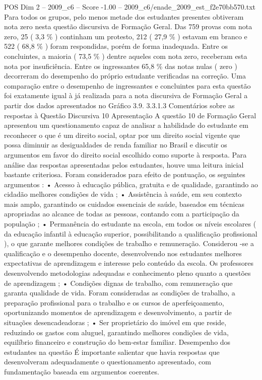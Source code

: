 \begin{textsample}{POS Dim 2 – 2009\_c6 – Score -1.00 – 2009\_c6/enade\_2009\_est\_f2e70bb570.txt}
Para todos os grupos, pelo menos metade dos estudantes presentes obtiveram nota zero nesta questão discursiva de Formação Geral.
Das 759 provas com nota zero, 25 ( 3,3 \% ) continham um protesto, 212 ( 27,9 \% ) estavam em branco e 522 ( 68,8 \% ) foram respondidas, porém de forma inadequada.
Entre os concluintes, a maioria ( 73,5 \% ) dentre aqueles com nota zero, receberam esta nota por insuficiência.
Entre os ingressantes 65,8 \% das notas nulas ( zero ) decorreram do desempenho do próprio estudante verificadas na correção.
Uma comparação entre o desempenho de ingressantes e concluintes para esta questão foi exatamente igual à já realizada para a nota discursiva de Formação Geral a partir dos dados apresentados no Gráfico 3.9. 3.3.1.3 Comentários sobre as respostas à Questão Discursiva 10 Apresentação A questão 10 de Formação Geral apresentou um questionamento capaz de analisar a habilidade do estudante em reconhecer o que é um direito social, optar por um direito social vigente que possa diminuir as desigualdades de renda familiar no Brasil e discutir os argumentos em favor do direito social escolhido como suporte à resposta.
Para análise das respostas apresentadas pelos estudantes, houve uma leitura inicial bastante criteriosa.
Foram considerados para efeito de pontuação, os seguintes argumentos : • Acesso à educação pública, gratuita e de qualidade, garantindo ao cidadão melhores condições de vida ; • Assistência à saúde, em seu contexto mais amplo, garantindo os cuidados essenciais de saúde, baseados em técnicas apropriadas ao alcance de todas as pessoas, contando com a participação da população ; • Permanência do estudante na escola, em todos os níveis escolares ( da educação infantil à educação superior, possibilitando a qualificação profissional ), o que garante melhores condições de trabalho e remuneração.
Considerou -se a qualificação e o desempenho docente, desenvolvendo nos estudantes melhores expectativas de aprendizagem e interesse pelo conteúdo da escola.
Os professores desenvolvendo metodologias adequadas e conhecimento pleno quanto a questões de aprendizagem ; • Condições dignas de trabalho, com remuneração que garanta qualidade de vida.
Foram consideradas as condições de trabalho, a preparação profissional para o trabalho e os cursos de aperfeiçoamento, oportunizando momentos de aprendizagem e desenvolvimento, a partir de situações desencadeadoras ; • Ser proprietário do imóvel em que reside, reduzindo os gastos com aluguel, garantindo melhores condições de vida, equilíbrio financeiro e construção do bem-estar familiar.
Desempenho dos estudantes na questão É importante salientar que havia respostas que desenvolveram adequadamente o questionamento apresentado, com fundamentação baseada em argumentos coerentes.

\end{textsample}
